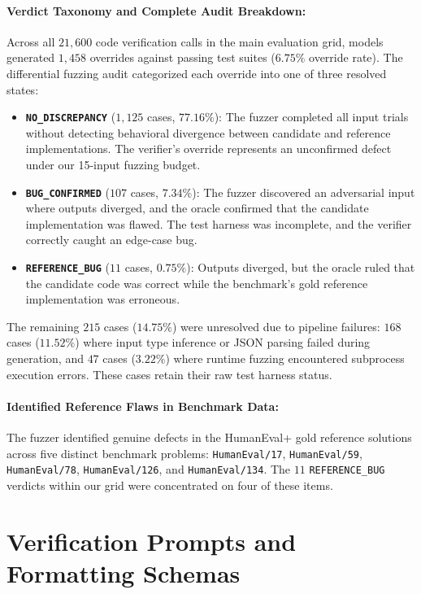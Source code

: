 \paragraph{Verdict Taxonomy and Complete Audit Breakdown:}
Across all $21{,}600$ code verification calls in the main evaluation grid, models generated $1{,}458$ overrides against passing test suites ($6.75\%$ override rate). The differential fuzzing audit categorized each override into one of three resolved states:
\begin{itemize}[nosep, leftmargin=*]
  \item \textbf{\texttt{NO\_DISCREPANCY}} ($1{,}125$ cases, $77.16\%$): The fuzzer completed all input trials without detecting behavioral divergence between candidate and reference implementations. The verifier's override represents an unconfirmed defect under our 15-input fuzzing budget.
  \item \textbf{\texttt{BUG\_CONFIRMED}} ($107$ cases, $7.34\%$): The fuzzer discovered an adversarial input where outputs diverged, and the oracle confirmed that the candidate implementation was flawed. The test harness was incomplete, and the verifier correctly caught an edge-case bug.
  \item \textbf{\texttt{REFERENCE\_BUG}} ($11$ cases, $0.75\%$): Outputs diverged, but the oracle ruled that the candidate code was correct while the benchmark's gold reference implementation was erroneous.
\end{itemize}
The remaining $215$ cases ($14.75\%$) were unresolved due to pipeline failures: $168$ cases ($11.52\%$) where input type inference or JSON parsing failed during generation, and $47$ cases ($3.22\%$) where runtime fuzzing encountered subprocess execution errors. These cases retain their raw test harness status.

\paragraph{Identified Reference Flaws in Benchmark Data:}
The fuzzer identified genuine defects in the HumanEval+ gold reference solutions across five distinct benchmark problems: \texttt{HumanEval/17}, \texttt{HumanEval/59}, \texttt{HumanEval/78}, \texttt{HumanEval/126}, and \texttt{HumanEval/134}. The $11$ \texttt{REFERENCE\_BUG} verdicts within our grid were concentrated on four of these items.

\section{Verification Prompts and Formatting Schemas}
\label{app:prompts}


